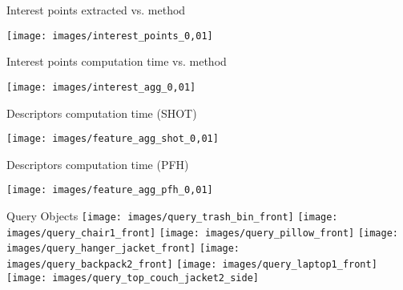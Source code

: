 \documentclass{beamer}
\begin{document}
\begin{frame}{Interest points extracted vs. method}
  \begin{center}
    \texttt{[image: images/interest\_points\_0,01]}
  \end{center}
\end{frame}
\begin{frame}{Interest points computation time vs. method}
  \begin{center}
    \texttt{[image: images/interest\_agg\_0,01]}
  \end{center}
\end{frame}
\begin{frame}{Descriptors computation time (SHOT)}
  \begin{center}
    \texttt{[image: images/feature\_agg\_shot\_0,01]}
  \end{center}
\end{frame}
\begin{frame}{Descriptors computation time (PFH)}
  \begin{center}
    \texttt{[image: images/feature\_agg\_pfh\_0,01]}
  \end{center}
\end{frame}
\begin{frame}{Query Objects}
  \texttt{[image: images/query\_trash\_bin\_front]}
  \texttt{[image: images/query\_chair1\_front]}
  \texttt{[image: images/query\_pillow\_front]}
  \texttt{[image: images/query\_hanger\_jacket\_front]}
  \texttt{[image: images/query\_backpack2\_front]}
  \texttt{[image: images/query\_laptop1\_front]}
  \texttt{[image: images/query\_top\_couch\_jacket2\_side]}
\end{frame}
\end{document}
